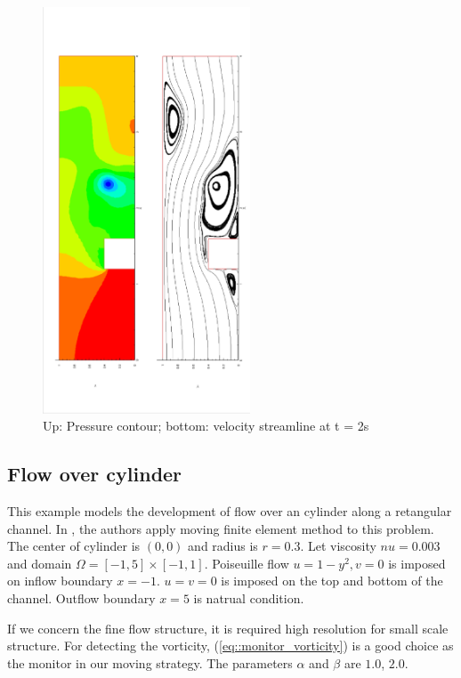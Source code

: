 \documentclass[a4paper, 11pt]{article}
\begin{document}
      \begin{figure}[!htbp]
        \centering
        \includegraphics[width = 0.55\textwidth, angle = -90]{picture/step_flow_data/contour_streamline_t_2s.eps}
        \caption{\small Up: Pressure contour; bottom: velocity streamline
          at t = 2s}
        \label{fig::step_flow_contour_streamline_2s}
      \end{figure}

   \subsection{Flow over cylinder}
   
      This example models the development of flow over an cylinder
      along a retangular channel. In \cite{cao1999anr}, the authors
      apply moving finite element method to this problem. The center
      of cylinder is $(0, 0)$ and radius is $r = 0.3$. Let viscosity
      $nu = 0.003$ and domain $\Omega = [-1, 5] \times [-1, 1]$. 
      Poiseuille flow $u = 1 - y^2, v = 0$ is imposed on inflow
      boundary $x = -1$. $u = v = 0$ is imposed on the top and bottom
      of the channel. Outflow boundary $x = 5$ is natrual
      condition. 

      If we concern the fine flow structure, it is required
      high resolution for small scale structure. For detecting the
      vorticity, (\ref{eq::monitor_vorticity}) is a good choice as the
      monitor in our moving strategy. The parameters $\alpha$ and
      $\beta$ are $1.0$, $2.0$. 
\end{document}
